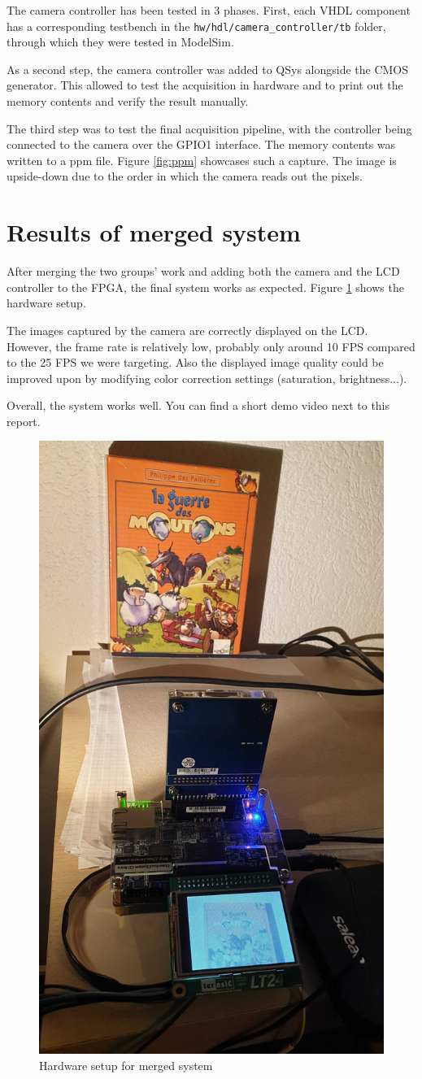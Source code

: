 \documentclass[12pt,a4paper]{article}
\begin{document}
The camera controller has been tested in 3 phases. First, each VHDL component has a corresponding testbench in the \texttt{hw/hdl/camera\_controller/tb} folder, through which they were tested in ModelSim.

As a second step, the camera controller was added to QSys alongside the CMOS generator. This allowed to test the acquisition in hardware and to print out the memory contents and verify the result manually.

The third step was to test the final acquisition pipeline, with the controller being connected to the camera over the GPIO1 interface. The memory contents was written to a ppm file. Figure \ref{fig:ppm} showcases such a capture. The image is upside-down due to the order in which the camera reads out the pixels.



\section{Results of merged system}

After merging the two groups' work and adding both the camera and the LCD controller to the FPGA, the final system works as expected. Figure \ref{fig:setup} shows the hardware setup. 

The images captured by the camera are correctly displayed on the LCD. However, the frame rate is relatively low, probably only around 10 FPS compared to the 25 FPS we were targeting. Also the displayed image quality could be improved upon by modifying color correction settings (saturation, brightness...).

Overall, the system works well. You can find a short demo video next to this report. 

\begin{figure}[h]
	\centering
	\includegraphics[width=.49\textwidth]{figures/setup}
	\caption{Hardware setup for merged system}
	\label{fig:setup}
\end{figure}
\end{document}
